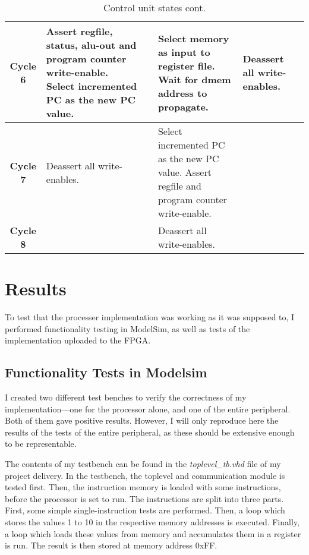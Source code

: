 \documentclass[11pt]{article}
\begin{document}
\begin{table}[htbp]
  \centering
  \begin{tabular}{|c|p{50pt}|p{50pt}|p{50pt}|p{50pt}|p{50pt}|}
    \hline
    {\bf Cycle 6} & Assert regfile, status, alu-out and program counter write-enable. Select incremented PC as the new PC value. &  & Select memory as input to register file. Wait for dmem address to propagate.  & Deassert all write-enables.  & \\ \hline
    {\bf Cycle 7} & Deassert all write-enables. &  & Select incremented PC as the new PC value. Assert regfile and program counter write-enable. &  &  \\ \hline
    {\bf Cycle 8} &  &  & Deassert all write-enables. &  &  \\ \hline
  \end{tabular}
  \caption{Control unit states cont.}
  \label{tab:controlUnitStatesCont}
\end{table}

\section{Results}
\label{sec:results}
To test that the processer implementation was working as it was
supposed to, I performed functionality testing in ModelSim, as well as
tests of the implementation uploaded to the FPGA.
\subsection{Functionality Tests in Modelsim}
\label{subsec:functestsim}
I created two different test benches to verify the correctness of my
implementation---one for the processor alone, and one of the entire
peripheral. Both of them gave positive results. However, I will only
reproduce here the results of the tests of the entire peripheral, as
these should be extensive enough to be representable.

The contents of my testbench can be found in the {\em
  toplevel\_tb.vhd} file of my project delivery. In the testbench, the
toplevel and communication module is tested first. Then, the
instruction memory is loaded with some instructions, before the
processor is set to run. The instructions are split into three
parts. First, some simple single-instruction tests are
performed. Then, a loop which stores the values 1 to 10 in the
respective memory addresses is executed. Finally, a loop which loads
these values from memory and accumulates them in a register is
run. The result is then stored at memory address 0xFF.
\end{document}
